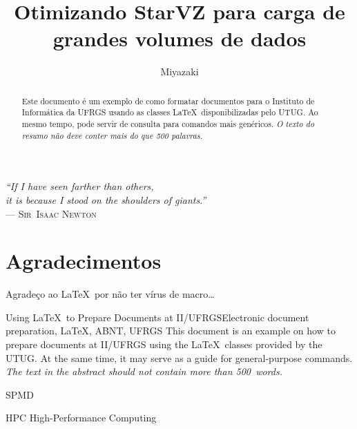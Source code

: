 \documentclass[ppgc,espec]{iiufrgs}
\title{Otimizando StarVZ para carga de grandes volumes de dados}
\author{Miyazaki}{Alexandre K. S.}
\begin{document}
\maketitle

\clearpage
\begin{flushright}
\mbox{}\vfill
{\sffamily\itshape
``If I have seen farther than others,\\
it is because I stood on the shoulders of giants.''\\}
--- \textsc{Sir~Isaac Newton}
\end{flushright}

\chapter*{Agradecimentos}
Agradeço ao \LaTeX\ por não ter vírus de macro\ldots



\begin{abstract}
Este documento é um exemplo de como formatar documentos para o
Instituto de Informática da UFRGS usando as classes \LaTeX\
disponibilizadas pelo UTUG\@. Ao mesmo tempo, pode servir de consulta
para comandos mais genéricos. \emph{O texto do resumo não deve
conter mais do que 500 palavras.}
\end{abstract}

\begin{englishabstract}{Using \LaTeX\ to Prepare Documents at II/UFRGS}{Electronic document preparation, \LaTeX, ABNT, UFRGS}
This document is an example on how to prepare documents at II/UFRGS
using the \LaTeX\ classes provided by the UTUG\@. At the same time, it
may serve as a guide for general-purpose commands. \emph{The text in
the abstract should not contain more than 500~words.}
\end{englishabstract}

\begin{listofabbrv}{SPMD}
        \item[HPC] High-Performance Computing
\end{listofabbrv}
\end{document}
